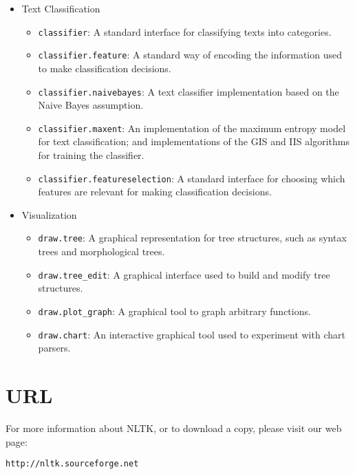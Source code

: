 \documentclass[12pt]{article}
\def\nogap{\setlength\itemsep{.0in}\setlength{\parskip}{0in}}
\begin{document}
{\begin{itemize}
  \item Text Classification
    \begin{itemize}\nogap
      \item \texttt{classifier}: A standard interface for classifying
          texts into categories.
      \item \texttt{classifier.feature}: A standard way of encoding
          the information used to make classification decisions.
      \item \texttt{classifier.naivebayes}: A text classifier
          implementation based on the Naive Bayes assumption.
      \item \texttt{classifier.maxent}: An implementation of the
          maximum entropy model for text classification; and
          implementations of the GIS and IIS algorithms for training
          the classifier.
      \item \texttt{classifier.featureselection}: A standard interface
          for choosing which features are relevant for making
          classification decisions.
    \end{itemize}

  \item Visualization
    \begin{itemize}\nogap 
      \item \texttt{draw.tree}: A graphical representation for tree
            structures, such as syntax trees and morphological trees. 
      \item \texttt{draw.tree\_edit}: A graphical interface used to
            build and modify tree structures.
      \item \texttt{draw.plot\_graph}: A graphical tool to graph
            arbitrary functions.
      \item \texttt{draw.chart}: An interactive graphical tool used to
            experiment with chart parsers.
    \end{itemize}

\end{itemize}
}
\section*{URL}

For more information about NLTK, or to download a copy, please
visit our web page: 

\texttt{http://nltk.sourceforge.net}
\end{document}
